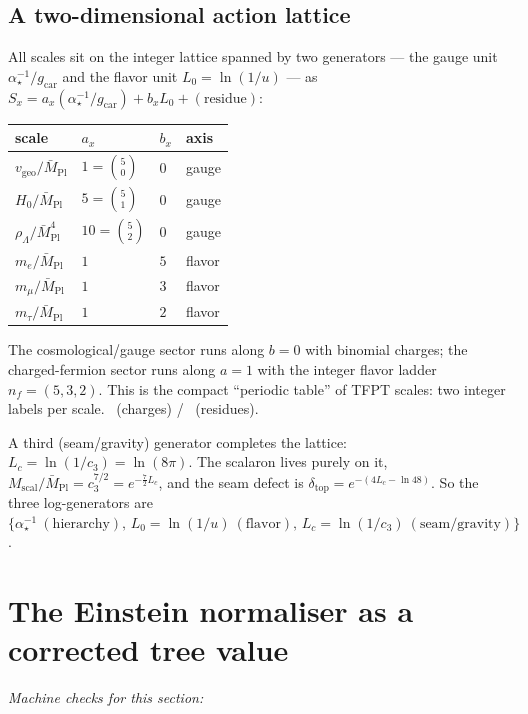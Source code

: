 \documentclass[11pt,a4paper]{article}
\newcommand{\Mbar}{\bar M_{\mathrm{Pl}}}
\newcommand{\gcar}{g_{\mathrm{car}}}
\newcommand{\cthree}{c_3}
\newcommand{\useed}{u}
\newcommand{\dtop}{\delta_{\mathrm{top}}}
\newcommand{\ainv}{\alpha^{-1}_\star}
\theoremstyle{definition}
\begin{document}
\subsection{A two-dimensional action lattice}

All scales sit on the integer lattice spanned by two generators --- the gauge unit $\ainv/\gcar$ and
the flavor unit $L_0=\ln(1/\useed)$ --- as $S_x=a_x(\ainv/\gcar)+b_x L_0+(\text{residue})$:
\begin{center}\small
\begin{tabular}{@{}llll@{}}
\toprule
scale & $a_x$ & $b_x$ & axis \\
\midrule
$v_{\mathrm{geo}}/\Mbar$ & $1=\binom50$ & $0$ & gauge \\
$H_0/\Mbar$ & $5=\binom51$ & $0$ & gauge \\
$\rho_\Lambda/\Mbar^4$ & $10=\binom52$ & $0$ & gauge \\
$m_e/\Mbar$ & $1$ & $5$ & flavor \\
$m_\mu/\Mbar$ & $1$ & $3$ & flavor \\
$m_\tau/\Mbar$ & $1$ & $2$ & flavor \\
\bottomrule
\end{tabular}
\end{center}
The cosmological/gauge sector runs along $b=0$ with binomial charges; the charged-fermion sector
runs along $a=1$ with the integer flavor ladder $n_f=(5,3,2)$. This is the compact ``periodic table''
of TFPT scales: two integer labels per scale. \mE\ (charges) / \mC\ (residues).

\noindent A third (seam/gravity) generator completes the lattice: $L_c=\ln(1/\cthree)=\ln(8\pi)$.
The scalaron lives purely on it, $M_{\mathrm{scal}}/\Mbar=\cthree^{7/2}=e^{-\frac72 L_c}$, and the seam
defect is $\dtop=e^{-(4L_c-\ln48)}$. So the three log-generators are $\{\ainv\ (\text{hierarchy}),\,
L_0=\ln(1/\useed)\ (\text{flavor}),\,L_c=\ln(1/\cthree)\ (\text{seam/gravity})\}$. \mE

\section{The Einstein normaliser as a corrected tree value}
\noindent\emph{Machine checks for this section:} 
\end{document}
